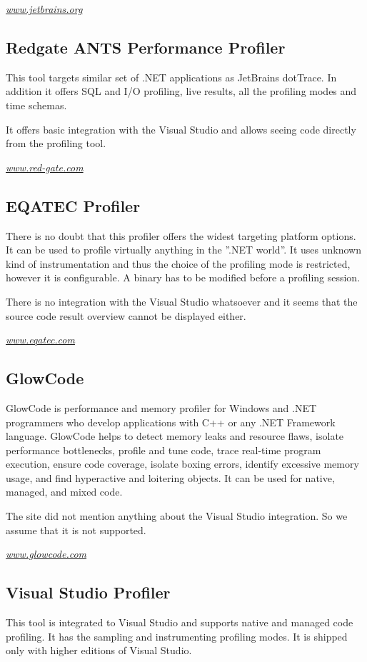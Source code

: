 \textit{\href{http://www.jetbrains.org}{www.jetbrains.org}	}

\subsection{Redgate ANTS Performance Profiler}
This tool targets similar set of .NET applications as JetBrains dotTrace. In addition it offers SQL and I/O  profiling, live results, all the profiling modes and time schemas. 

It offers basic integration with the Visual Studio and allows seeing code directly from the profiling tool. 

\textit{\href{http://www.red-gate.com}{www.red-gate.com}}

\subsection{EQATEC Profiler}
There is no doubt that this profiler offers the widest targeting platform options. It can be used to profile virtually anything in the ''.NET world''. It uses unknown kind of instrumentation and thus the choice of the profiling mode is restricted, however it is configurable. A binary has to be modified before a profiling session.

There is no integration with the Visual Studio whatsoever and it seems that the source code result overview cannot be displayed either.

\textit{\href{http://www.eqatec.com}{www.eqatec.com}}

\subsection{GlowCode}
GlowCode is performance and memory profiler for Windows and .NET programmers who develop applications with C++ or any .NET Framework language. GlowCode helps to detect memory leaks and resource flaws, isolate performance bottlenecks, profile and tune code, trace real-time program execution, ensure code coverage, isolate boxing errors, identify excessive memory usage, and find hyperactive and loitering objects. It can be used for native, managed, and mixed code. \cite{01GlowCodeWeb} 

The site did not mention anything about the Visual Studio integration. So we assume that it is not supported.


\textit{\href{http://www.glowcode.com/}{www.glowcode.com}}

\subsection{Visual Studio Profiler}
This tool is integrated to Visual Studio and supports native and managed code profiling. It has the sampling and instrumenting profiling modes. It is shipped only with higher editions of Visual Studio.

